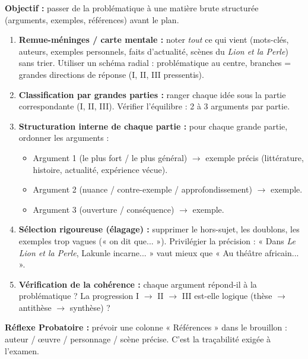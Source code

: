\documentclass[11pt]{article}
\newcommand{\cle}[1]{{\popxbold\color{popdark}#1}}
\begin{document}
\begin{methode}
    \textbf{Objectif :} passer de la problématique à une matière brute structurée (arguments, exemples, références) avant le plan.
    \begin{enumerate}
        \item \textbf{Remue-méninges / carte mentale :} noter \emph{tout} ce qui vient (mots-clés, auteurs, exemples personnels, faits d'actualité, scènes du \emph{Lion et la Perle}) sans trier. Utiliser un schéma radial : problématique au centre, branches = grandes directions de réponse (I, II, III pressentis).
        \item \textbf{Classification par \cle{grandes parties} :} ranger chaque idée sous la partie correspondante (I, II, III). Vérifier l'équilibre : 2 à 3 arguments par partie.
        \item \textbf{Structuration interne de chaque partie :} pour chaque grande partie, ordonner les arguments :
            \begin{itemize}
                \item Argument 1 (le plus fort / le plus général) $\rightarrow$ exemple précis (littérature, histoire, actualité, expérience vécue).
                \item Argument 2 (nuance / contre-exemple / approfondissement) $\rightarrow$ exemple.
                \item Argument 3 (ouverture / conséquence) $\rightarrow$ exemple.
            \end{itemize}
        \item \textbf{Sélection rigoureuse (élagage) :} supprimer le hors-sujet, les doublons, les exemples trop vagues (« on dit que... »). Privilégier la \cle{précision} : « Dans \emph{Le Lion et la Perle}, Lakunle incarne... » vaut mieux que « Au théâtre africain... ».
        \item \textbf{Vérification de la cohérence :} chaque argument répond-il à la problématique ? La progression I $\rightarrow$ II $\rightarrow$ III est-elle logique (thèse $\rightarrow$ antithèse $\rightarrow$ synthèse) ?
    \end{enumerate}
    \textbf{Réflexe Probatoire :} prévoir une \cle{colonne « Références »} dans le brouillon : auteur / œuvre / personnage / scène précise. C'est la traçabilité exigée à l'examen.
\end{methode}
\end{document}

